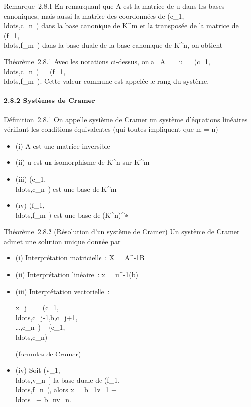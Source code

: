 \documentclass[]{article}
\begin{document}
Remarque~2.8.1 En remarquant que A est la matrice de u dans les bases
canoniques, mais aussi la matrice des coordonnées de
(c_1,\\ldots,c_n~)
dans la base canonique de K^m et la transposée de la matrice
de
(f_1,\\ldots,f_m~)
dans la base duale de la base canonique de K^n, on obtient

Théorème~2.8.1 Avec les notations ci-dessus, on a
\mathrmrg~A
= \mathrmrg~u
=\
\mathrmrg(c_1,\\ldots,c_n~)
=\
\mathrmrg(f_1,\\ldots,f_m~).
Cette valeur commune est appelée le rang du système.

\paragraph{2.8.2 Systèmes de Cramer}

Définition~2.8.1 On appelle système de Cramer un système d'équations
linéaires vérifiant les conditions équivalentes (qui toutes impliquent
que m = n)

\begin{itemize}
\itemsep1pt\parskip0pt
\item
  (i) A est une matrice inversible
\item
  (ii) u est un isomorphisme de K^n sur K^m
\item
  (iii)
  (c_1,\\ldots,c_n~)
  est une base de K^m
\item
  (iv)
  (f_1,\\ldots,f_m~)
  est une base de (K^n)^∗
\end{itemize}

Théorème~2.8.2 (Résolution d'un système de Cramer) Un système de Cramer
admet une solution unique donnée par

\begin{itemize}
\item
  (i) Interprétation matricielle~: X = A^-1B
\item
  (ii) Interprétation linéaire~: x = u^-1(b)
\item
  (iii) Interprétation vectorielle~:

  x_j =
  ~
  (c_1,\\ldots,c_j-1,b,c_j+1,\\\ldots,c_n~)
  \over
  \mathrm{det}~
  (c_1,\\ldots,c_n)~

  (formules de Cramer)
\item
  (iv) Soit
  (v_1,\\ldots,v_n~)
  la base duale de
  (f_1,\\ldots,f_n~),
  alors x = b_1v_1 +
  \\ldots~ +
  b_nv_n.
\end{itemize}
\end{document}

